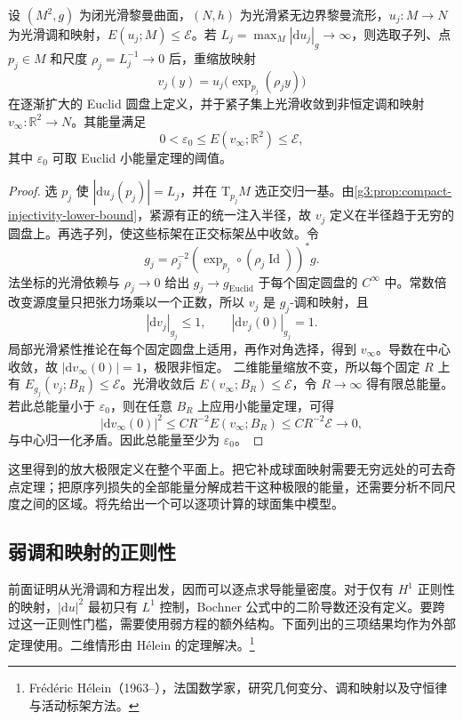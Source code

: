 \begin{proposition}\label{g3:prop:harmonic-map-blowup-plane}
	设 \((M^2,g)\) 为闭光滑黎曼曲面，\((N,h)\) 为光滑紧无边界黎曼流形，\(u_j:M\to N\) 为光滑调和映射，\(E(u_j;M)\le\mathcal E\)。若
	\(L_j=\max_M|\mathrm du_j|_g\to\infty\)，则选取子列、点 \(p_j\in M\) 和尺度 \(\rho_j=L_j^{-1}\to0\) 后，重缩放映射
	\[
		v_j(y)=u_j\bigl(\exp_{p_j}(\rho_j y)\bigr)
	\]
	在逐渐扩大的 Euclid 圆盘上定义，并于紧子集上光滑收敛到非恒定调和映射 \(v_\infty:\mathbb R^2\to N\)。其能量满足
	\[
		0<\varepsilon_0\le E(v_\infty;\mathbb R^2)\le\mathcal E,
	\]
	其中 \(\varepsilon_0\) 可取 Euclid 小能量定理的阈值。
\end{proposition}
\begin{proof}
	选 \(p_j\) 使 \(|\mathrm du_j(p_j)|=L_j\)，并在 \(\mathrm T_{p_j}M\) 选正交归一基。由\cref{g3:prop:compact-injectivity-lower-bound}，紧源有正的统一注入半径，故 \(v_j\) 定义在半径趋于无穷的圆盘上。再选子列，使这些标架在正交标架丛中收敛。令
	\[
		g_j=\rho_j^{-2}(\exp_{p_j}\circ(\rho_j\operatorname{Id}))^*g.
	\]
	法坐标的光滑依赖与 \(\rho_j\to0\) 给出 \(g_j\to g_{\mathrm{Euclid}}\) 于每个固定圆盘的 \(C^\infty\) 中。常数倍改变源度量只把张力场乘以一个正数，所以 \(v_j\) 是 \(g_j\)-调和映射，且
	\[
		|\mathrm dv_j|_{g_j}\le1,\qquad |\mathrm dv_j(0)|_{g_j}=1.
	\]
	局部光滑紧性推论在每个固定圆盘上适用，再作对角选择，得到 \(v_\infty\)。导数在中心收敛，故 \(|\mathrm dv_\infty(0)|=1\)，极限非恒定。
	二维能量缩放不变，所以每个固定 \(R\) 上有 \(E_{g_j}(v_j;B_R)\le\mathcal E\)。光滑收敛后 \(E(v_\infty;B_R)\le\mathcal E\)，令 \(R\to\infty\) 得有限总能量。若此总能量小于 \(\varepsilon_0\)，则在任意 \(B_R\) 上应用小能量定理，可得
	\[
		|\mathrm dv_\infty(0)|^2\le C R^{-2}E(v_\infty;B_R)
		\le C R^{-2}\mathcal E\longrightarrow0,
	\]
	与中心归一化矛盾。因此总能量至少为 \(\varepsilon_0\)。
\end{proof}

这里得到的放大极限定义在整个平面上。把它补成球面映射需要无穷远处的可去奇点定理；把原序列损失的全部能量分解成若干这种极限的能量，还需要分析不同尺度之间的区域。将先给出一个可以逐项计算的球面集中模型。

\subsection{弱调和映射的正则性}
\label{g3:subsec:1803:06}
前面证明从光滑调和方程出发，因而可以逐点求导能量密度。对于仅有 \(H^1\) 正则性的映射，\(|\mathrm du|^2\) 最初只有 \(L^1\) 控制，Bochner 公式中的二阶导数还没有定义。要跨过这一正则性门槛，需要使用弱方程的额外结构。下面列出的三项结果均作为外部定理使用。二维情形由 Hélein 的定理解决。\footnote{Frédéric Hélein（1963--），法国数学家，研究几何变分、调和映射以及守恒律与活动标架方法。}

